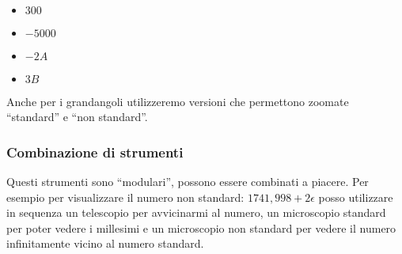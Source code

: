 \begin{esempio}~

\begin{multicols}{4}
\begin{itemize}[nosep]
 \item \(300\)
 \item \(-5000\)
 \item \(-2A\)
 \item \(3B\)
\end{itemize}
\end{multicols}
\vspace{-5mm}
\begin{inaccessibleblock}
\begin{minipage}{.48\linewidth}
 \begin{center}
\scalebox{0.7}{\grandangoloa}
 \end{center}
\end{minipage}
\hfill
\begin{minipage}{.48\linewidth}
 \begin{center}
\scalebox{0.7}{\grandangolob}
 \end{center}
\end{minipage}
\end{inaccessibleblock}
\end{esempio}

Anche per i grandangoli utilizzeremo versioni che permettono zoomate 
``standard'' e ``non standard''.

\begin{inaccessibleblock}
\begin{minipage}{.38\linewidth}
\subsubsection{Combinazione di strumenti}
\label{subsec:insnum_combinazione}

Questi strumenti sono ``modulari'', possono essere combinati a piacere. 
Per esempio per visualizzare il numero non standard: 
\(1741,998 +2\epsilon\) posso utilizzare in sequenza un telescopio per 
avvicinarmi al numero, un microscopio standard per poter vedere i 
millesimi e un microscopio non standard per vedere il numero infinitamente 
vicino al numero standard.
\end{minipage}
\hfill
\begin{minipage}{.58\linewidth}
 \begin{center}
\scalebox{0.7}{\combinazione}
 \end{center}
\end{minipage}
\end{inaccessibleblock}

